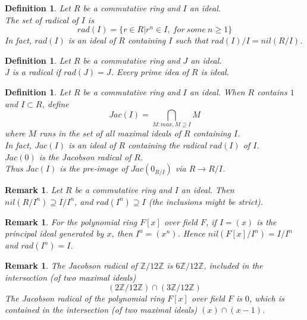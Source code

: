 \documentclass[a4paper,8pt]{article}
\newcommand{\hlt}[1]{\textit{{\color{blue}#1}}}
\theoremstyle{theorem}
\newtheorem{definition}[theorem]{Definition}
\newtheorem{remark}[theorem]{Remark}
\begin{document}
\begin{definition}
Let $R$ be a commutative ring and $I$ an ideal.\\
The set of \hlt{radical of $I$} is 
\begin{equation}
rad(I) = \{ r \in R | r^n \in I, \ for \ some \ n \geq 1\} \nonumber
\end{equation}
In fact, $rad(I)$ is an ideal of $R$ containing $I$ such that $rad(I)/I = nil(R/I)$.\\
\end{definition}


\begin{definition}
Let $R$ be a commutative ring and $J$ an ideal.\\
$J$ is a radical if $rad(J) = J$. Every prime idea of $R$ is ideal.\\
\end{definition}


\begin{definition}
Let $R$ be a commutative ring and $I$ an ideal.
When $R$ contains $1$ and $I \subset R$, define 
\begin{equation}
Jac(I) = \bigcap_{M: max, M \supseteq I} M \nonumber
\end{equation}
where $M$ runs in the set of all maximal ideals of $R$ containing $I$.\\
In fact, $Jac(I)$ is an ideal of $R$ containing the radical $rad(I)$ of $I$.\\
$Jac(0)$ is the \hlt{Jacobson radical of $R$}.\\
Thus $Jac(I)$ is the pre-image of $Jac(0_{R/I})$ via $R \rightarrow R/I$.\\
\end{definition}


\begin{remark}
Let $R$ be a commutative ring and $I$ an ideal. Then $nil(R/I^n) \supseteq I/I^n$, and $rad(I^n) \supseteq I$ (the inclusions might be strict).
\end{remark}


\begin{remark}
For the polynomial ring $F[x]$ over field $F$, if $I=(x)$ is the principal ideal generated by $x$, then $I^n = (x^n)$. Hence $nil(F[x]/I^n)=I/I^n$	and $rad(I^n) = I$.
\end{remark}


\begin{remark}
The Jacobson radical of $\mathbb{Z}/12\mathbb{Z}$ is $6\mathbb{Z}/12\mathbb{Z}$, included in the intersection (of two maximal ideals) 
\begin{equation}
(2\mathbb{Z}/12\mathbb{Z}) \cap (3\mathbb{Z}/12\mathbb{Z}) \nonumber
\end{equation}
The Jacobson radical of the polynomial ring $F[x]$ over field $F$ is $0$, which is contained in the intersection (of two maximal ideals) $(x) \cap (x-1)$.\\
\end{remark}
\end{document}

